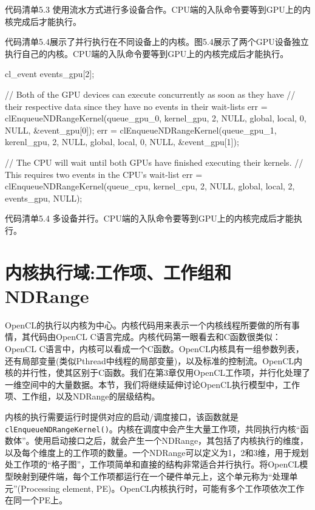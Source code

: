 代码清单5.3 使用流水方式进行多设备合作。CPU端的入队命令要等到GPU上的内核完成后才能执行。



代码清单5.4展示了并行执行在不同设备上的内核。图5.4展示了两个GPU设备独立执行自己的内核。CPU端的入队命令要等到GPU上的内核完成后才能执行。

\begin{codebox}[cpp]
cl_event events_gpu[2];

// Both of the GPU devices can execute concurrently as soon as they have
// their respective data since they have no events in their wait-lists
err = clEnqueueNDRangeKernel(queue_gpu_0, kernel_gpu, 2, NULL, global, local, 0, NULL, &event_gpu[0]);
err = clEnqueueNDRangeKernel(queue_gpu_1, kerenl_gpu, 2, NULL, global, local, 0, NULL, &event_gpu[1]);

// The CPU will wait until both GPUs have finished executing their kernels.
// This requires two events in the CPU's wait-list
err = clEnqueueNDRangeKernel(queue_cpu, kernel_cpu, 2, NULL, global, local, 2, events_gpu, NULL);
\end{codebox}

代码清单5.4 多设备并行。CPU端的入队命令要等到GPU上的内核完成后才能执行。



\section{内核执行域:工作项、工作组和NDRange}

OpenCL的执行以内核为中心。内核代码用来表示一个内核线程所要做的所有事情，其代码由OpenCL C语言完成。内核代码第一眼看去和C函数很类似：OpenCL C语言中，内核可以看成一个C函数。OpenCL内核具有一组参数列表，还有局部变量(类似Pthread中线程的局部变量)，以及标准的控制流。OpenCL内核的并行性，使其区别于C函数。我们在第3章仅用OpenCL工作项，并行化处理了一维空间中的大量数据。本节，我们将继续延伸讨论OpenCL执行模型中，工作项、工作组，以及NDRange的层级结构。

内核的执行需要运行时提供对应的启动/调度接口，该函数就是\texttt{clEnqueueNDRangeKernel()}。内核在调度中会产生大量工作项，共同执行内核“函数体”。使用启动接口之后，就会产生一个NDRange，其包括了内核执行的维度，以及每个维度上的工作项的数量。一个NDRange可以定义为1，2和3维，用于规划处工作项的“格子图”，工作项简单和直接的结构非常适合并行执行。将OpenCL模型映射到硬件端，每个工作项都运行在一个硬件单元上，这个单元称为“处理单元”(Processing element, PE)。OpenCL内核执行时，可能有多个工作项依次工作在同一个PE上。

